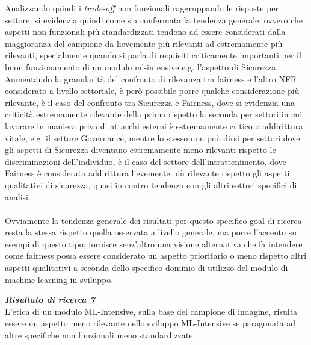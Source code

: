     Analizzando quindi i \emph{trade-off} non funzionali raggruppando le risposte per settore, si evidenzia quindi come sia confermata la tendenza generale, ovvero che aspetti non funzionali più standardizzati tendono ad essere considerati dalla maggioranza del campione da lievemente più rilevanti ad estremamente più rilevanti, specialmente quando si parla di requisiti criticamente importanti per il buon funzionamento di un modulo ml-intensive e.g. l'aspetto di Sicurezza. Aumentando la granularità del confronto di rilevanza tra fairness e l'altro NFR considerato a livello settoriale, è però possibile porre qualche considerazione più rilevante, è il caso del confronto tra Sicurezza e Fairness, dove si evidenzia una criticità estremamente rilevante della prima rispetto la seconda per settori in cui lavorare in maniera priva di attacchi esterni è estremamente critico o addirittura vitale, e.g. il settore Governance, mentre lo stesso non può dirsi per settori dove gli aspetti di Sicurezza diventano estremamente meno rilevanti rispetto le discriminazioni dell'individuo, è il caso del settore dell'intrattenimento, dove Fairness è considerata addirittura lievemente più rilevante rispetto gli aspetti qualitativi di sicurezza, quasi in contro tendenza con gli altri settori specifici di analisi. \\\\
    
    Ovviamente la tendenza generale dei risultati per questo specifico goal di ricerca resta la stessa rispetto quella osservata a livello generale, ma porre l'accento su esempi di questo tipo, fornisce senz'altro una visione alternativa che fa intendere come fairness possa essere considerato un aspetto prioritario o meno rispetto altri aspetti qualitativi a seconda dello specifico dominio di utilizzo del modulo di machine learning in sviluppo.
    
    \begin{center}
	
        \begin{tcolorbox}[width=\textwidth, colframe=black, colback=Gray]
    			\begin{minipage}{\textwidth}
    				\textit{\faKey  \textbf{ Risultato di ricerca 7}}\\
    			L'etica di un modulo ML-Intensive, sulla base del campione di indagine, risulta essere un aspetto meno rilevante nello sviluppo ML-Intensive se paragonata ad altre specifiche non funzionali meno standardizzate.
    			\end{minipage}
		\end{tcolorbox}
	\end{center}
	
